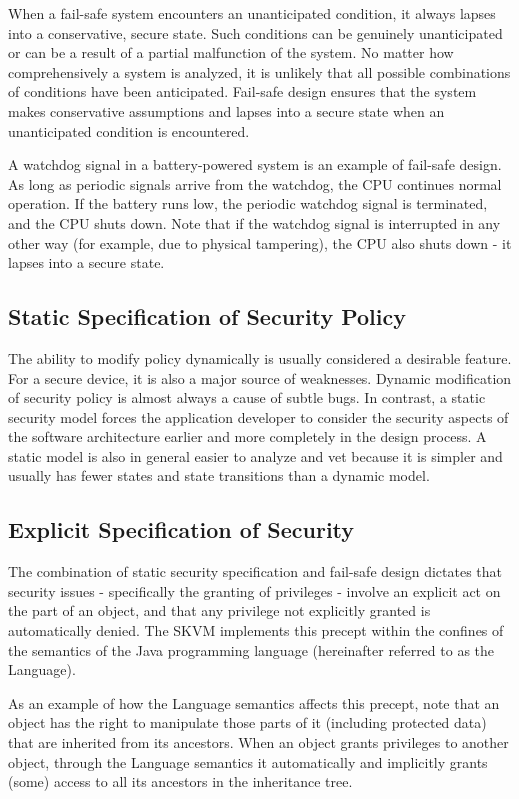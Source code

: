 \documentclass{llncs}
\begin{document}
When a fail-safe system encounters an unanticipated condition, it
always lapses into a conservative, secure state. Such conditions
can be genuinely unanticipated or can be a result of a partial
malfunction of the system. No matter how comprehensively a system
is analyzed, it is unlikely that all possible combinations of
conditions have been anticipated. Fail-safe design ensures that the
system makes conservative assumptions and lapses into a secure state
when an unanticipated condition is encountered.

A watchdog signal in a battery-powered system is an example of
fail-safe design. As long as periodic signals arrive from the
watchdog, the CPU continues normal operation. If the battery runs
low, the periodic watchdog signal is terminated, and the CPU shuts
down. Note that if the watchdog signal is interrupted in any other
way (for example, due to physical tampering), the CPU also shuts
down - it lapses into a secure state.

\subsection{Static Specification of Security Policy}

The ability to modify policy dynamically is usually considered a
desirable feature. For a secure device, it is also a major source
of weaknesses. Dynamic modification of security policy is almost
always a cause of subtle bugs. In contrast, a static security model
forces the application developer to consider the security aspects
of the software architecture earlier and more completely in the
design process. A static model is also in general easier to analyze
and vet because it is simpler and usually has fewer states and state
transitions than a dynamic model.

\subsection{Explicit Specification of Security}

The combination of static security specification and fail-safe
design dictates that security issues - specifically the granting
of privileges - involve an explicit act on the part of an object,
and that any privilege not explicitly granted is automatically
denied. The SKVM implements this precept within the confines of the
semantics of the Java programming language (hereinafter referred
to as the Language).

As an example of how the Language semantics affects this precept,
note that an object has the right to manipulate those parts of it
(including protected data) that are inherited from its ancestors.
When an object grants privileges to another object, through the
Language semantics it automatically and implicitly grants (some) access
to all its ancestors in the inheritance tree.
\end{document}
